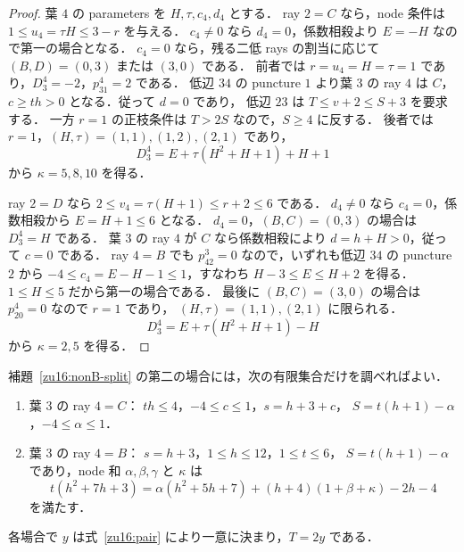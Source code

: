 \begin{proof}
葉 $4$ の parameters を $H,\tau,c_4,d_4$ とする．
ray $2=C$ なら，node 条件は $1\le u_4=\tau H\le3-r$ を与える．
$c_4\ne0$ なら $d_4=0$，係数相殺より $E=-H$ なので第一の場合となる．
$c_4=0$ なら，残る二低 rays の割当に応じて
$(B,D)=(0,3)$ または $(3,0)$ である．
前者では $r=u_4=H=\tau=1$ であり，$D^4_3=-2$，$p^4_{31}=2$ である．
低辺 $34$ の puncture $1$ より葉 $3$ の ray $4$ は $C$，
$c\ge th>0$ となる．従って $d=0$ であり，
低辺 $23$ は $T\le v+2\le S+3$ を要求する．
一方 $r=1$ の正枝条件は $T>2S$ なので，$S\ge4$ に反する．
後者では $r=1$，$(H,\tau)=(1,1),(1,2),(2,1)$ であり，
\[
 D^4_3=E+\tau(H^2+H+1)+H+1
\]
から $\kappa=5,8,10$ を得る．

ray $2=D$ なら $2\le v_4=\tau(H+1)\le r+2\le6$ である．
$d_4\ne0$ なら $c_4=0$，係数相殺から $E=H+1\le6$ となる．
$d_4=0$，$(B,C)=(0,3)$ の場合は $D^4_3=H$ である．
葉 $3$ の ray $4$ が $C$ なら係数相殺により $d=h+H>0$，従って $c=0$ である．
ray $4=B$ でも $p^3_{42}=0$ なので，いずれも低辺 $34$ の puncture $2$ から
$-4\le c_4=E-H-1\le1$，すなわち $H-3\le E\le H+2$ を得る．
$1\le H\le5$ だから第一の場合である．
最後に $(B,C)=(3,0)$ の場合は $p^4_{20}=0$ なので $r=1$ であり，
$(H,\tau)=(1,1),(2,1)$ に限られる．
\[
 D^4_3=E+\tau(H^2+H+1)-H
\]
から $\kappa=2,5$ を得る．
\end{proof}

\begin{lemma}[自由な係数を残す分岐の有限化]
\label{zu16:free-E}
補題~\ref{zu16:nonB-split} の第二の場合には，次の有限集合だけを調べればよい．
\begin{enumerate}
\item 葉 $3$ の ray $4=C$：
$th\le4$，$-4\le c\le1$，$s=h+3+c$，
$S=t(h+1)-\alpha$，$-4\le\alpha\le1$．
\item 葉 $3$ の ray $4=B$：
$s=h+3$，$1\le h\le12$，$1\le t\le6$，
$S=t(h+1)-\alpha$ であり，node 和 $\alpha,\beta,\gamma$ と $\kappa$ は
\begin{equation}\label{zu16:free-E-identity}
 t(h^2+7h+3)
 =\alpha(h^2+5h+7)+(h+4)(1+\beta+\kappa)-2h-4
\end{equation}
を満たす．
\end{enumerate}
各場合で $y$ は式~\eqref{zu16:pair} により一意に決まり，$T=2y$ である．
\end{lemma}

